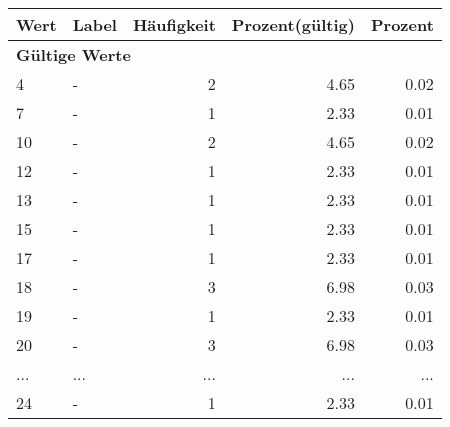      \begin{longtable}{lXrrr}
     \toprule
     \textbf{Wert} & \textbf{Label} & \textbf{Häufigkeit} & \textbf{Prozent(gültig)} & \textbf{Prozent} \\
     \endhead
     \midrule
     \multicolumn{5}{l}{\textbf{Gültige Werte}}\\
        4 & \multicolumn{1}{X}{-} & %
          \num{2} &
          \num[round-mode=places,round-precision=2]{4,65} &
          \num[round-mode=places,round-precision=2]{0,02} \\
        7 & \multicolumn{1}{X}{-} & %
          \num{1} &
          \num[round-mode=places,round-precision=2]{2,33} &
          \num[round-mode=places,round-precision=2]{0,01} \\
        10 & \multicolumn{1}{X}{-} & %
          \num{2} &
          \num[round-mode=places,round-precision=2]{4,65} &
          \num[round-mode=places,round-precision=2]{0,02} \\
        12 & \multicolumn{1}{X}{-} & %
          \num{1} &
          \num[round-mode=places,round-precision=2]{2,33} &
          \num[round-mode=places,round-precision=2]{0,01} \\
        13 & \multicolumn{1}{X}{-} & %
          \num{1} &
          \num[round-mode=places,round-precision=2]{2,33} &
          \num[round-mode=places,round-precision=2]{0,01} \\
        15 & \multicolumn{1}{X}{-} & %
          \num{1} &
          \num[round-mode=places,round-precision=2]{2,33} &
          \num[round-mode=places,round-precision=2]{0,01} \\
        17 & \multicolumn{1}{X}{-} & %
          \num{1} &
          \num[round-mode=places,round-precision=2]{2,33} &
          \num[round-mode=places,round-precision=2]{0,01} \\
        18 & \multicolumn{1}{X}{-} & %
          \num{3} &
          \num[round-mode=places,round-precision=2]{6,98} &
          \num[round-mode=places,round-precision=2]{0,03} \\
        19 & \multicolumn{1}{X}{-} & %
          \num{1} &
          \num[round-mode=places,round-precision=2]{2,33} &
          \num[round-mode=places,round-precision=2]{0,01} \\
        20 & \multicolumn{1}{X}{-} & %
          \num{3} &
          \num[round-mode=places,round-precision=2]{6,98} &
          \num[round-mode=places,round-precision=2]{0,03} \\
       ... & ... & ... & ... & ... \\
        24 & \multicolumn{1}{X}{-} & %
          \num{1} &
          \num[round-mode=places,round-precision=2]{2,33} &
          \num[round-mode=places,round-precision=2]{0,01} \\


\end{longtable}
